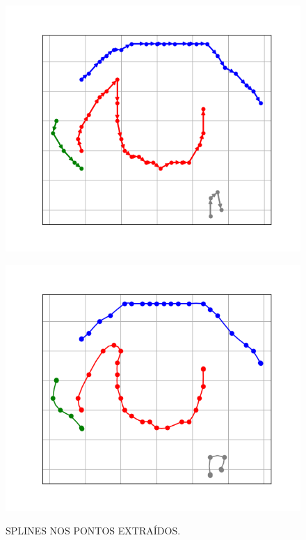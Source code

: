 \begin{figure}[h!]
    \caption{SPLINES NOS PONTOS EXTRAÍDOS.}
    \centering
    \begin{minipage}[b]{0.45\textwidth}
        \centering
        \includegraphics[width=1\linewidth]{fig/07_sorted_points_right_eye.png}
        \label{fig:reordenacao}
    \end{minipage}
    \hfill
    \begin{minipage}[b]{0.45\textwidth}
        \centering
        \includegraphics[width=1\linewidth]{fig/08_spline_plot_right_eye.png}
        \label{fig:spline}
    \end{minipage}
\end{figure}





